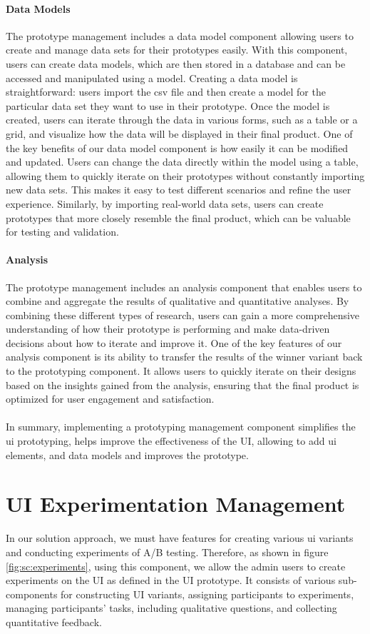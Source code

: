 \paragraph{Data Models}
The prototype management includes a data model component allowing users to create and manage data sets for their prototypes easily. 
With this component, users can create data models, which are then stored in a database and can be accessed and manipulated using a model.
Creating a data model is straightforward: users import the \ac{csv} file and then create a model for the particular data set they want to use in their prototype. 
Once the model is created, users can iterate through the data in various forms, such as a table or a grid, and visualize how the data will be displayed in their final product.
One of the key benefits of our data model component is how easily it can be modified and updated. 
Users can change the data directly within the model using a table, allowing them to quickly iterate on their prototypes without constantly importing new data sets. 
This makes it easy to test different scenarios and refine the user experience.
Similarly, by importing real-world data sets, users can create prototypes that more closely resemble the final product, which can be valuable for testing and validation.

\paragraph{Analysis}
The prototype management includes an analysis component that enables users to combine and aggregate the results of qualitative and quantitative analyses. 
By combining these different types of research, users can gain a more comprehensive understanding of how their prototype is performing and make data-driven decisions about how to iterate and improve it. 
One of the key features of our analysis component is its ability to transfer the results of the winner variant back to the prototyping component. 
It allows users to quickly iterate on their designs based on the insights gained from the analysis, ensuring that the final product is optimized for user engagement and satisfaction.\\\\
In summary, implementing a prototyping management component simplifies the \ac{ui} prototyping, helps improve the effectiveness of the UI, allowing to add \ac{ui} elements, and data models and improves the prototype.

\clearpage
\section{UI Experimentation Management}
\label{sc:section:experimentation}
In our solution approach, we must have features for creating various \ac{ui} variants and conducting experiments of A/B testing. 
Therefore, as shown in figure \ref{fig:sc:experiments}, using this component, we allow the admin users to create experiments on the UI as defined in the UI prototype.
It consists of various sub-components for constructing UI variants, assigning participants to experiments, managing participants' tasks, including qualitative questions, and collecting quantitative feedback.

